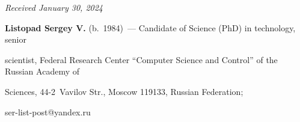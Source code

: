 \vspace*{-6pt}





\hfill{\small\textit{Received January 30, 2024}} 





\vspace*{-14pt} 





\Contrl





\vspace*{-3pt}


   


   \noindent


   \textbf{Listopad Sergey V.} (b.\ 1984)~--- Candidate of Science (PhD) in technology, senior 


scientist, Federal Research Center ``Computer Science and Control'' of the Russian Academy of 


Sciences, 44-2~Vavilov Str., Moscow 119133, Russian Federation; 


 \mbox{ser-list-post@yandex.ru}


   





  


\label{end\stat}





\renewcommand{\bibname}{\protect\rm Литература}     


